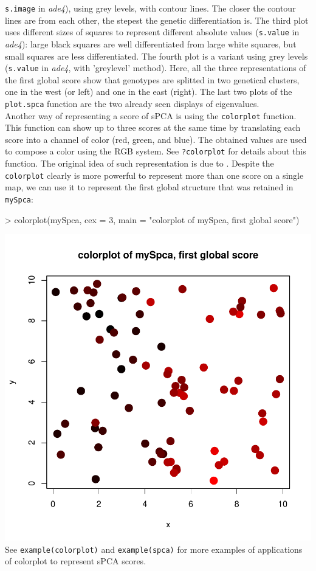 \documentclass{article}
\begin{document}
\texttt{s.image} in \textit{ade4}), using grey levels, with contour lines.
The closer the contour lines are from each other, the stepest the
genetic differentiation is.
The third plot uses different sizes of squares to represent different
absolute values (\texttt{s.value} in \textit{ade4}): large black squares are well differentiated from
large white squares, but small squares are less differentiated.
The fourth plot is a variant using grey levels (\texttt{s.value} in
\textit{ade4}, with 'greylevel' method).
Here, all the three representations of the first global score show
that genotypes are splitted in two genetical clusters, one in the west
(or left) and one in the east (right).
The last two plots of the \texttt{plot.spca} function are the two
already seen displays of eigenvalues.
\\

Another way of representing a score of sPCA is using the
\texttt{colorplot} function.
This function can show up to three scores at the same time by
translating each score into a channel of color (red, green, and blue).
The obtained values are used to compose a color using the RGB system.
See \texttt{?colorplot} for details about this function.
The original idea of such representation is due to \cite{tj179}.
Despite the \texttt{colorplot} clearly is more powerful to represent
more than one score on a single map, we can use it to represent the
first global structure that was retained in \texttt{mySpca}:
\begin{Schunk}
\begin{Sinput}
> colorplot(mySpca, cex = 3, main = "colorplot of mySpca, first global score")
\end{Sinput}
\end{Schunk}
\includegraphics{figs/spca-colorplot}
\noindent See \texttt{example(colorplot)} and \texttt{example(spca)}
for more examples of applications of colorplot to represent sPCA scores.
\end{document}

